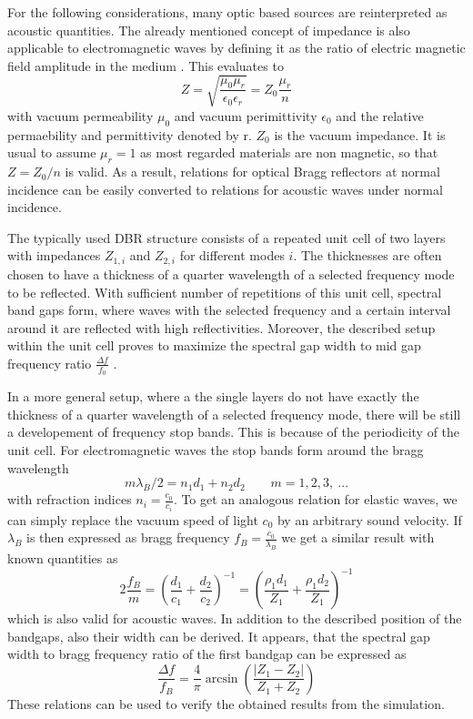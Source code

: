 For the following considerations, many optic based sources are reinterpreted
as acoustic quantities. The already mentioned concept of impedance is also
applicable to electromagnetic waves by defining it as the ratio of electric
magnetic field amplitude in the medium \cite{brekhovskikh2012waves}. This
evaluates to
\begin{equation}
    Z = \sqrt{\frac{\mu_0\mu_r}{\epsilon_0\epsilon_r}} = Z_0 \frac{\mu_r}{n}
\end{equation}
with vacuum permeability $\mu_0$ and vacuum perimittivity $\epsilon_0$ and
the relative permaebility and permittivity denoted by r. $Z_0$ is the vacuum
impedance. It is usual to assume $\mu_r=1$ as most regarded materials are non
magnetic, so that $Z = Z_0/n$ is valid. As a result, relations for optical
Bragg reflectors at normal incidence can be easily converted to relations for 
acoustic waves under normal incidence.

The typically used DBR structure consists of a repeated unit cell of two layers
with impedances $Z_{1,i}$ and $Z_{2,i}$ for different modes $i$. The
thicknesses are often chosen to have a thickness of a quarter wavelength
of a selected frequency mode to be reflected. With sufficient number of
repetitions of this unit cell, spectral band gaps form, where waves with the
selected frequency and a certain interval around it are reflected with high
reflectivities. Moreover, the described setup within the unit cell proves to
maximize the spectral gap width to mid gap frequency ratio
$\frac{\Delta f}{f_0}$ \cite{Osting2012}.

In a more general setup, where a the single layers do not have exactly the
thickness of a quarter wavelength of a selected frequency mode, there will be
still a developement of frequency stop bands. This is because of the
periodicity of the unit cell. For electromagnetic waves the stop bands form
around the bragg wavelength
\begin{equation}
    m\lambda_B/2 = n_1 d_1 + n_2 d_2 \quad\quad m=1,2,3,\ ...
\end{equation}
with refraction indices $n_i=\frac{c_0}{c_i}$. To get an analogous relation for
elastic waves, we can simply replace the vacuum speed of light $c_0$ by an
arbitrary sound velocity. If $\lambda_B$ is then expressed as bragg frequency
$f_B = \frac{c_0}{\lambda_B}$ we get a similar result with known quantities as
\begin{equation}
    2\frac{f_B}{m} = \left(\frac{d_1}{c_1}+\frac{d_2}{c_2}\right)^{-1} =
    \left(\frac{\rho_1 d_1}{Z_1}+\frac{\rho_1 d_2}{Z_1}\right)^{-1}
\end{equation}
which is also valid for acoustic waves. In addition to the described position
of the bandgaps, also their width can be derived. It appears, that the spectral
gap width to bragg frequency ratio of the first bandgap can be expressed as
\begin{equation}
    \frac{\Delta f}{f_B} = \frac{4}{\pi} \arcsin \left( \frac{|Z_1-Z_2|}{Z_1+Z_2}
    \right)
\end{equation}
These relations can be used to verify the obtained results from the simulation.